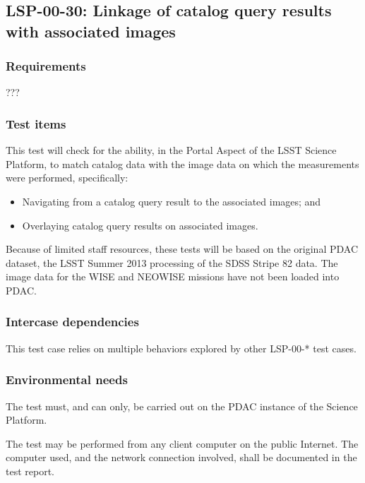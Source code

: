 \subsection{LSP-00-30: Linkage of catalog query results with associated images}
\label{lsp-00-30}

\subsubsection{Requirements}

???

\subsubsection{Test items}

This test will check for the ability, in the Portal Aspect of the LSST Science Platform, to match catalog data with the image data on which the measurements were performed, specifically:

\begin{itemize}

  \item{Navigating from a catalog query result to the associated images; and}
  \item{Overlaying catalog query results on associated images.}

\end{itemize}

Because of limited staff resources, these tests will be based on the original PDAC dataset, the LSST Summer 2013 processing of the SDSS Stripe 82 data.
The image data for the WISE and NEOWISE missions have not been loaded into PDAC.

\subsubsection{Intercase dependencies}

This test case relies on multiple behaviors explored by other LSP-00-* test cases.

\subsubsection{Environmental needs}

The test must, and can only, be carried out on the PDAC instance of the Science Platform.

The test may be performed from any client computer on the public Internet.
The computer used, and the network connection involved, shall be documented in the test report.

